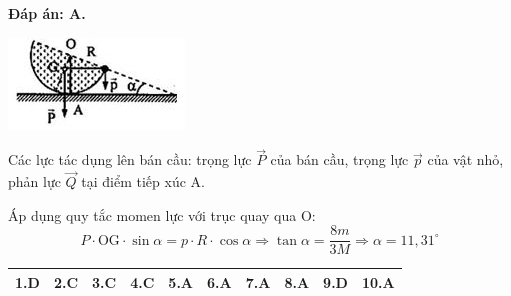 \begin{enumerate}[label=\bfseries Câu \arabic*:, leftmargin=1.5cm]
	\hideall
	{	\textbf{Đáp án: A.}
		
		\begin{center}
			\includegraphics[scale=1]{../figs/VN10-2021-PH-TP021-8.png}
		\end{center}
		
		Các lực tác dụng lên bán cầu: trọng lực $\vec P$ của bán cầu, trọng lực $\vec p$ của vật nhỏ, phản lực $\vec Q$ tại điểm tiếp xúc A.
		
		Áp dụng quy tắc momen lực với trục quay qua O:
		$$P \cdot \text{OG} \cdot \sin \alpha = p \cdot R \cdot \cos \alpha \Rightarrow \tan \alpha = \dfrac{8m}{3M} \Rightarrow \alpha = 11,31^\circ$$
	}
	
	
\end{enumerate}



\ANSMCQ
{
	\begin{center}
		\begin{tabular}{|m{2.8em}|m{2.8em}|m{2.8em}|m{2.8em}|m{2.8em}|m{2.8em}|m{2.8em}|m{2.8em}|m{2.8em}|m{2.8em}|}
			\hline
			1.D  & 2.C  & 3.C & 4.C & 5.A  & 6.A & 7.A & 8.A & 9.D & 10.A  \\
			\hline
			
		\end{tabular}
	\end{center}
}
